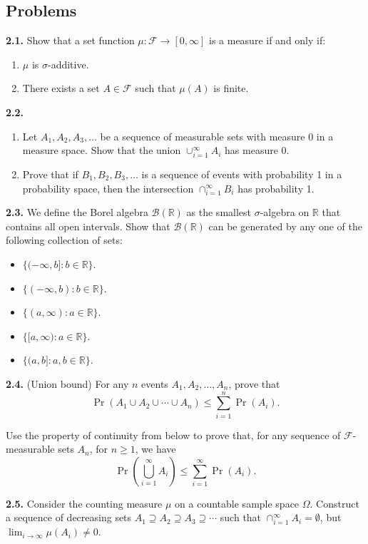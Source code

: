 \subsection*{Problems}

\textbf{2.1.} Show that a set function $\mu:\mathcal{F}\to [0,\infty]$ is a measure if and only if:
\begin{enumerate}[label=\arabic*.]
    \item $\mu$ is $\sigma$-additive.
    \item There exists a set $A\in \mathcal{F}$ such that $\mu(A)$ is finite.
\end{enumerate}

\textbf{2.2.}
\begin{enumerate}[label=(\alph*)]
    \item Let $A_1,A_2,A_3,\dots$ be a sequence of measurable sets with measure 0 in a measure space. Show that the union $\cup_{i=1}^{\infty} A_i$ has measure 0.
    \item Prove that if $B_1,B_2,B_3,\dots$ is a sequence of events with probability 1 in a probability space, then the intersection $\cap_{i=1}^{\infty} B_i$ has probability 1.
\end{enumerate}

\textbf{2.3.} We define the Borel algebra $\mathcal{B}(\mathbb{R})$ as the smallest $\sigma$-algebra on $\mathbb{R}$ that contains all open intervals. Show that $\mathcal{B}(\mathbb{R})$ can be generated by any one of the following collection of sets:
\begin{itemize}
    \item $\{(-\infty,b] : b\in \mathbb{R}\}$.
    \item $\{(-\infty,b) : b\in \mathbb{R}\}$.
    \item $\{(a,\infty) : a\in \mathbb{R}\}$.
    \item $\{[a,\infty) : a\in \mathbb{R}\}$.
    \item $\{(a,b] : a,b\in \mathbb{R}\}$.
\end{itemize}

\textbf{2.4.} (Union bound) For any $n$ events $A_1,A_2,\dots,A_n$, prove that
\[
\Pr(A_1\cup A_2\cup \cdots \cup A_n)\le \sum_{i=1}^{n} \Pr(A_i).
\]

Use the property of continuity from below to prove that, for any sequence of $\mathcal{F}$-measurable sets $A_n$, for $n\ge 1$, we have
\[
\Pr\left(\bigcup_{i=1}^{\infty} A_i\right)\le \sum_{i=1}^{\infty} \Pr(A_i).
\]

\textbf{2.5.} Consider the counting measure $\mu$ on a countable sample space $\Omega$. Construct a sequence of decreasing sets $A_1\supseteq A_2\supseteq A_3\supseteq \cdots$ such that $\cap_{i=1}^{\infty} A_i=\emptyset$, but $\lim_{i\to\infty} \mu(A_i)\neq 0$.

